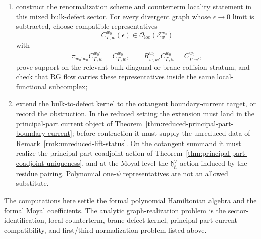 \documentclass[11pt]{memoir}
\begin{document}
\begin{prob}
\begin{enumerate}
	    \item construct the renormalization scheme and counterterm locality
	      statement in this mixed bulk-defect sector. For every divergent graph
	      whose \(\epsilon\to0\) limit is subtracted, choose compatible
	      representatives
	      \[
	        C_{\Gamma,w}^{w_0}(\epsilon)\in
	          \mathcal O_{\mathrm{loc}}(\mathcal E_w^{w_0})
	      \]
	      with
	      \[
	        \pi_{w_0'w_0}C_{\Gamma,w}^{w_0'}=C_{\Gamma,w}^{w_0},
	        \qquad
	        R^{w_0}_{w,w'}C_{\Gamma,w}^{w_0}=C_{\Gamma,w'}^{w_0},
	      \]
	      prove support on the relevant bulk diagonal or brane-collision
	      stratum, and check that RG flow carries these representatives inside
	      the same local-functional subcomplex;
	    \item extend the bulk-to-defect kernel to the cotangent boundary-current
	      target, or record the obstruction. In the reduced setting the
	      extension must land in the principal-part current object of
	      Theorem~\ref{thm:reduced-principal-part-boundary-current}; before
	      contraction it must supply the unreduced data of
	      Remark~\ref{rmk:unreduced-lift-status}. On the cotangent summand it
	      must realize the principal-part coadjoint action of
	      Theorem~\ref{thm:principal-part-coadjoint-uniqueness}, and at the
	      Moyal level the \(\mathfrak h_\hbar^\vee\)-action induced by the
	      residue pairing. Polynomial one-\(\psi\) representatives are not an
	      allowed substitute.
	  \end{enumerate}
	  The computations here settle the formal polynomial Hamiltonian algebra
	  and the formal Moyal coefficients. The analytic graph-realization
	  problem is the sector-identification, local counterterm, brane-defect
	  kernel, principal-part-current compatibility, and first/third
	  normalization problem listed above.
\end{prob}
\end{document}
